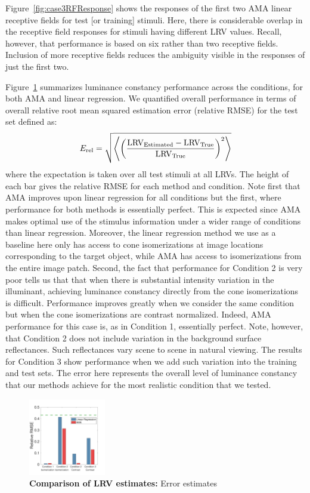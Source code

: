 \documentclass{jov}
\begin{document}
Figure~\ref{fig:case3RFResponse} shows the responses of the first two AMA linear receptive fields for test [or training] stimuli.
Here, there is considerable overlap in the receptive field responses for stimuli having different LRV values.
Recall, however, that performance is based on six rather than two receptive fields.
Inclusion of more receptive fields reduces the ambiguity visible in the responses of just the first two.

Figure~\ref{fig:barGraphs} summarizes luminance constancy performance across the conditions, for both AMA and linear regression. 
We quantified overall performance in terms of overall relative root mean squared estimation error (relative RMSE) for the test set defined as:
\begin{align}
E_{\rm rel} = \sqrt{\left\langle\left(\frac{\rm{LRV_{Estimated}-LRV_{True}}}{\rm{LRV_{True}}}\right)^2\right\rangle}
\label{eq:relRMSe}
\end{align}
where the expectation is taken over all test stimuli at all LRVs.
The height of each bar gives the relative RMSE for each method and condition.
Note first that AMA improves upon linear regression for all conditions but the first, where performance for both methods is essentially perfect.
This is expected since AMA makes optimal use of the stimulus information under a wider range
of conditions than linear regression.
Moreover, the linear regression method we use as a baseline here
only has access to cone isomerizations at image locations corresponding to the target object, while AMA has access to isomerizations from the entire image patch.
Second, the fact that performance for Condition 2 is very poor tells us that that when there is substantial intensity variation in the illuminant, achieving luminance constancy
directly from the cone isomerizations is difficult.
Performance improves greatly when we consider the same condition but when the cone isomerizations are contrast normalized. 
Indeed, AMA performance for this case is, as in Condition 1, essentially perfect.
Note, however, that Condition 2 does not include variation in the background surface reflectances.
Such reflectances vary scene to scene in natural viewing.
The results for Condition 3 show performance when we add such variation into the training and test sets.
The error here represents the overall level of luminance constancy that our methods achieve for the
most realistic condition that we tested.

\begin{figure}
\centering
\includegraphics[width=0.3\textwidth]{../FiguresDraft4/Figure13/Figure13_a.pdf}
\caption{{\bf Comparison of LRV estimates:} Error estimates}
 \label{fig:barGraphs}
\end{figure}
\end{document}
